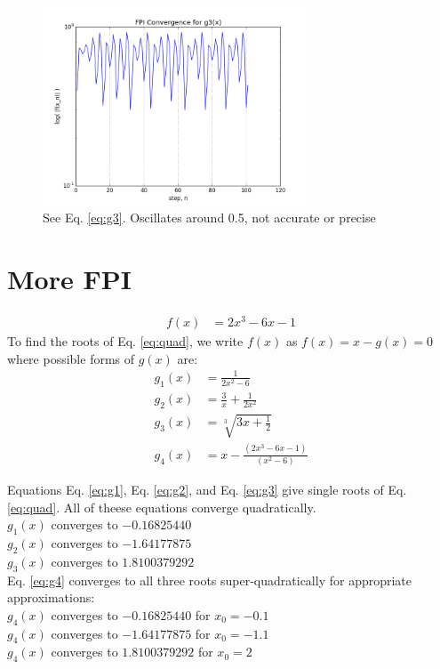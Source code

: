 \documentclass[12pt]{article}
\begin{document}
  \begin{figure}[h]
    \centering
    \includegraphics[width=0.7\textwidth]{Problem4dc.png}
    \caption{See Eq. \ref{eq:g3}. Oscillates around 0.5, not accurate or precise}
  \end{figure}

  \clearpage

  \section{More FPI}

  \begin{align}
    \label{eq:quad}
    f(x) &= 2x^3 - 6x -1
  \end{align}
  To find the roots of Eq. \ref{eq:quad}, we write $f(x)$ as $f(x)=x-g(x)=0$
  where possible forms of $g(x)$ are:
  \begin{align}
    \label{eq:g1}
    g_1(x) &= \frac{1}{2x^2-6} \\
    \label{eq:g2}
    g_2(x) &= \frac{3}{x}+\frac{1}{2x^2} \\
    \label{eq:g3}
    g_3(x) &= \sqrt[3]{3x + \frac{1}{2}} \\
    \label{eq:g4}
    g_4(x) &= x - \frac{(2x^3-6x-1)}{(x^2-6)}
  \end{align}

  Equations Eq. \ref{eq:g1}, Eq. \ref{eq:g2}, and Eq. \ref{eq:g3} give single roots
  of Eq. \ref{eq:quad}. All of theese equations converge quadratically.\\
  $g_1(x)$ converges to $-0.16825440$\\
  $g_2(x)$ converges to $-1.64177875$\\
  $g_3(x)$ converges to $1.8100379292$\\

  Eq. \ref{eq:g4} converges to all three roots super-quadratically 
  for appropriate approximations:\\
  $g_4(x)$ converges to $-0.16825440$ for $x_0=-0.1$\\
  $g_4(x)$ converges to $-1.64177875$ for $x_0=-1.1$\\
  $g_4(x)$ converges to $1.8100379292$ for $x_0=2$
  
\end{document}
